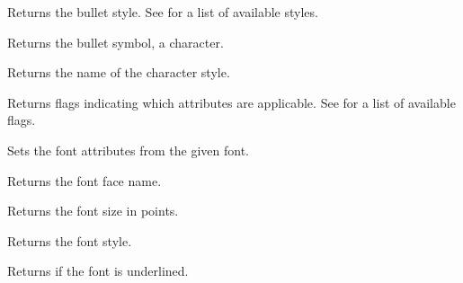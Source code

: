 Returns the bullet style.
See  for a list of available styles.

\label{wxrichtextattrgetbulletsymbol}


Returns the bullet symbol, a character.

\label{wxrichtextattrgetcharacterstylename}


Returns the name of the character style.

\label{wxrichtextattrgetflags}


Returns flags indicating which attributes are applicable.
See  for a list of available flags.

\label{wxrichtextattrgetfontattributes}


Sets the font attributes from the given font.

\label{wxrichtextattrgetfontfacename}


Returns the font face name.

\label{wxrichtextattrgetfontsize}


Returns the font size in points.

\label{wxrichtextattrgetfontstyle}


Returns the font style.

\label{wxrichtextattrgetfontunderlined}


Returns \true if the font is underlined.

